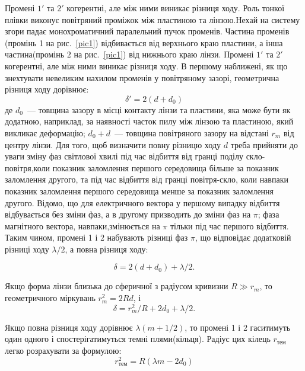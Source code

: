 \documentclass{LabWorkTemplate}
\begin{document}
Промені $1'$ та $2'$ когерентні,  але між ними виникає різниця ходу. Роль тонкої плівки виконує повітряний проміжок між пластиною та лінзою.Нехай на систему згори  падає монохроматичний паралельний пучок променів. Частина променів (промінь 1 на рис.~\ref{pic1}) відбивається від верхнього краю пластини, а інша частина(промінь $2$ на рис.~\ref{pic1}) від нижнього краю лінзи. Промені $1'$ та $2'$ когерентні,  але між ними виникає різниця ходу. В першому наближені, як що знехтувати невеликим нахилом променів у повітряному зазорі, геометрична різниця ходу дорівнює:
\begin{equation}
\delta' =2(d+d_{0})
\end{equation}
де $d_{0}$~--- товщина зазору в місці контакту лінзи та пластини, яка може бути як додатною, наприклад, за наявності часток пилу між лінзою та пластиною, який викликає деформацію; $d_{0}+d$~--- товщина повітряного зазору на відстані $r_m$ від центру лінзи. Для того, щоб визначити повну  різницю ходу $d$  треба прийняти до уваги зміну фаз світлової хвилі під час відбиття від гранці поділу скло-повітря,коли показник заломлення першого середовища більше за показник заломлення другого, та під час відбиття від гранці повітря-скло, коли навпаки показник заломлення першого середовища менше за показник заломлення другого. Відомо, що для електричного вектора у першому випадку відбиття відбувається  без зміни фаз, а в другому призводить до зміни  фаз на $\pi$; фаза магнітного вектора, навпаки,змінюється на $\pi$ тільки під час першого відбиття. Таким чином, промені 1 і 2 набувають різниці фаз $\pi$, що відповідає додатковій різниці ходу $\lambda/2$, а повна різниця ходу:

\begin{equation}
\delta =2(d+d_{0})+\lambda/2.
\end{equation}

Якщо форма лінзи близька до сферичної з радіусом кривизни $R \gg r_m$, то геометричного міркувань $r^2_m = 2Rd $, і
\begin{equation}
\delta=r^2_m/R+2d_{0}+\lambda/2.
\end{equation}

Якщо повна різниця ходу дорівнює $\lambda(m+1/2)$, то промені 1 і 2 гаситимуть один одного і спостерігатимуться темні плями(кільця). Радіус цих кілець $r_\text{тем}$ легко розрахувати за формулою:
\begin{equation}
\label{rdark}
r_\text{тем}^2=R(\lambda m-2d_{0})
\end{equation}
\end{document}
